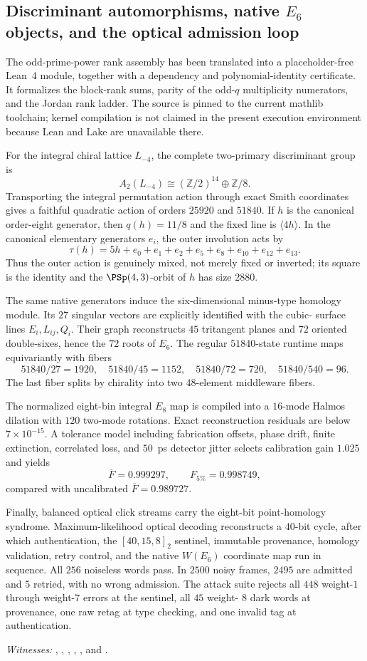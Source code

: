 \subsection{Discriminant automorphisms, native $E_6$ objects, and the optical admission loop}
\label{sec:levi-next5-v3}

The odd-prime-power rank assembly has been translated into a placeholder-free
Lean~4 module, together with a dependency and polynomial-identity certificate.
It formalizes the block-rank sums, parity of the odd-$q$ multiplicity
numerators, and the Jordan rank ladder. The source is pinned to the current
mathlib toolchain; kernel compilation is not claimed in the present execution
environment because Lean and Lake are unavailable there.

For the integral chiral lattice $L_{-4}$, the complete two-primary
discriminant group is
\[
 A_2(L_{-4})\cong(\mathbb Z/2)^{14}\oplus\mathbb Z/8.
\]
Transporting the integral permutation action through exact Smith coordinates
gives a faithful quadratic action of orders $25920$ and $51840$. If $h$ is
the canonical order-eight generator, then $q(h)=11/8$ and the fixed line is
$\langle4h\rangle$. In the canonical elementary generators $e_i$, the outer
involution acts by
\[
 \tau(h)=5h+e_0+e_1+e_2+e_5+e_8+e_{10}+e_{12}+e_{13}.
\]
Thus the outer action is genuinely mixed, not merely fixed or inverted; its
square is the identity and the $\PSp(4,3)$-orbit of $h$ has size $2880$.

The same native generators induce the six-dimensional minus-type homology
module. Its $27$ singular vectors are explicitly identified with the cubic-
surface lines $E_i,L_{ij},Q_i$. Their graph reconstructs $45$ tritangent
planes and $72$ oriented double-sixes, hence the $72$ roots of $E_6$. The
regular $51840$-state runtime maps equivariantly with fibers
\[
 51840/27=1920,\quad 51840/45=1152,\quad
 51840/72=720,\quad 51840/540=96.
\]
The last fiber splits by chirality into two $48$-element middleware fibers.

The normalized eight-bin integral $E_8$ map is compiled into a $16$-mode
Halmos dilation with $120$ two-mode rotations. Exact reconstruction residuals
are below $7\times10^{-15}$. A tolerance model including fabrication offsets,
phase drift, finite extinction, correlated loss, and $50$~ps detector jitter
selects calibration gain $1.025$ and yields
\[
 \overline F=0.999297,\qquad F_{5\%}=0.998749,
\]
compared with uncalibrated $\overline F=0.989727$.

Finally, balanced optical click streams carry the eight-bit point-homology
syndrome. Maximum-likelihood optical decoding reconstructs a $40$-bit cycle,
after which authentication, the $[40,15,8]_2$ sentinel, immutable provenance,
homology validation, retry control, and the native $W(E_6)$ coordinate map run
in sequence. All $256$ noiseless words pass. In $2500$ noisy frames, $2495$
are admitted and $5$ retried, with no wrong admission. The attack suite rejects
all $448$ weight-$1$ through weight-$7$ errors at the sentinel, all $45$ weight-
$8$ dark words at provenance, one raw retag at type checking, and one invalid
tag at authentication.

\emph{Witnesses:}
,
,
,
,
, and
.
